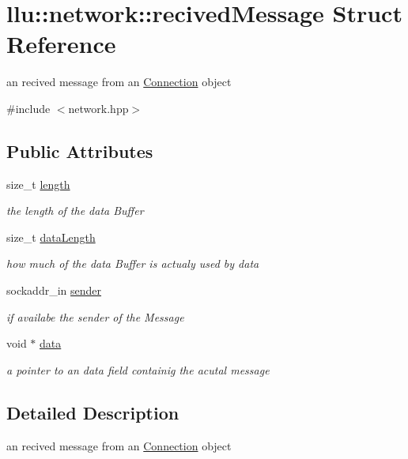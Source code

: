 \hypertarget{structllu_1_1network_1_1recived_message}{\section{llu\+:\+:network\+:\+:recived\+Message Struct Reference}
\label{structllu_1_1network_1_1recived_message}
}


an recived message from an \hyperlink{classllu_1_1network_1_1_connection}{Connection} object  




{\ttfamily \#include $<$network.\+hpp$>$}

\subsection*{Public Attributes}
\begin{DoxyCompactItemize}
\item 
size\+\_\+t \hyperlink{structllu_1_1network_1_1recived_message_a6afc4099f30c393381c79c72d5093d8a}{length}
\begin{DoxyCompactList}\small\item\em the length of the data Buffer \end{DoxyCompactList}\item 
size\+\_\+t \hyperlink{structllu_1_1network_1_1recived_message_a01a039e5ee47a330b32c2b419d25cfd6}{data\+Length}
\begin{DoxyCompactList}\small\item\em how much of the data Buffer is actualy used by data \end{DoxyCompactList}\item 
sockaddr\+\_\+in \hyperlink{structllu_1_1network_1_1recived_message_a3e4538771244b3008f889a03a587c81b}{sender}
\begin{DoxyCompactList}\small\item\em if availabe the sender of the Message \end{DoxyCompactList}\item 
void $\ast$ \hyperlink{structllu_1_1network_1_1recived_message_a26f9f75bd002582bcf4c6624cbbdb1fb}{data}
\begin{DoxyCompactList}\small\item\em a pointer to an data field containig the acutal message \end{DoxyCompactList}\end{DoxyCompactItemize}


\subsection{Detailed Description}
an recived message from an \hyperlink{classllu_1_1network_1_1_connection}{Connection} object 


